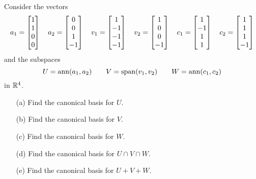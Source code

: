 \documentclass[a4paper]{article}
\begin{document}
\begin{problem}[2013-14]
 Consider the vectors
 \[ 
  a_1 = \left[\begin{matrix}  1\\ 1\\ 0\\  0 \end{matrix}\right] \quad
  a_2 = \left[\begin{matrix}  0\\ 0\\ 1\\ -1 \end{matrix}\right] \quad
  v_1 = \left[\begin{matrix}  1\\-1\\-1\\ -1 \end{matrix}\right] \quad
  v_2 = \left[\begin{matrix}  1\\ 0\\ 0\\ -1 \end{matrix}\right] \quad
  c_1 = \left[\begin{matrix}  1\\-1\\ 1\\  1 \end{matrix}\right] \quad
  c_2 = \left[\begin{matrix}  1\\ 1\\ 1\\ -1 \end{matrix}\right]
 \]
 and the subspaces
 \[ U = \operatorname{ann}(a_1,a_2) \qquad
    V = \operatorname{span}(v_1,v_2) \qquad
    W = \operatorname{ann}(c_1,c_2)
 \]
 in ${\mathbb{R}}^4$.
 \begin{itemize}
  \item[(a)] Find the canonical basis for $U$. 
  \item[(b)] Find the canonical basis for $V$. 
  \item[(c)] Find the canonical basis for $W$. 
  \item[(d)] Find the canonical basis for $U\cap V\cap W$. 
  \item[(e)] Find the canonical basis for $U+V+W$. 
 \end{itemize}
\end{problem}
\end{document}
